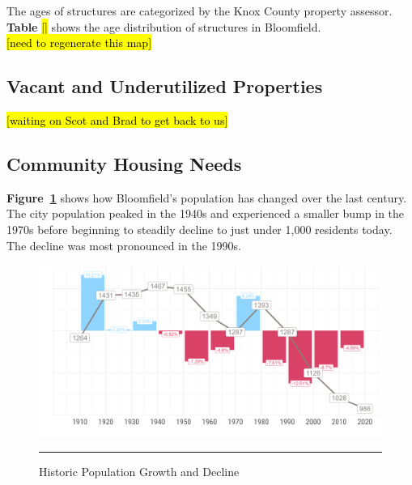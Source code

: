 \noindent The ages of structures are categorized by the Knox County property assessor. \textbf{Table} \hl{[]} shows the age distribution of structures in Bloomfield.\\

\noindent \hl{[need to regenerate this map]}

\pagebreak
\subsection{Vacant and Underutilized Properties}
\noindent \hl{[waiting on Scot and Brad to get back to us]}

\pagebreak
\subsection{Community Housing Needs}


\noindent \textbf{Figure~\ref{fig:historicPop}} shows how Bloomfield's population has changed over the last century. The city population peaked in the 1940s and experienced a smaller bump in the 1970s before beginning to steadily decline to just under 1,000 residents today. The decline was most pronounced in the 1990s.

\begin{figure}[H]
\centering
\begin{framed}
    \caption{Historic Population Growth and Decline}
    \label{fig:historicPop}
    \includegraphics[width=\linewidth]{figures/historical_population_trends.png}
    \rule[-5pt]{\linewidth}{0.4pt}
\end{framed}
\end{figure}

